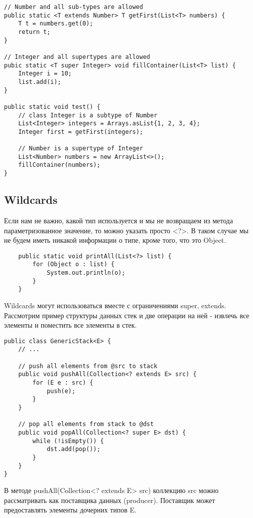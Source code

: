 \documentclass[a4paper,12pt]{extreport}
\begin{document}
\begin{lstlisting}
// Number and all sub-types are allowed
public static <T extends Number> T getFirst(List<T> numbers) {
    T t = numbers.get(0);
    return t;
}

// Integer and all supertypes are allowed
pubic static <T super Integer> void fillContainer(List<T> list) {
    Integer i = 10;
    list.add(i);
}

public static void test() {
    // class Integer is a subtype of Number
    List<Integer> integers = Arrays.asList{1, 2, 3, 4};
    Integer first = getFirst(integers);
    
    // Number is a supertype of Integer
    List<Number> numbers = new ArrayList<>();
    fillContainer(numbers);
}
\end{lstlisting}

\subsection*{Wildcards}
Если нам не важно, какой тип используется и мы не возвращаем из метода параметризованное значение, то можно указать просто <?>. В таком случае мы не будем иметь никакой информации о типе, кроме того, что это Object.

\begin{lstlisting}
    public static void printAll(List<?> list) {
        for (Object o : list) {
            System.out.println(o);
        }
    }
\end{lstlisting}

Wildcards могут использоваться вместе с ограничениями super, extends. Рассмотрим пример структуры данных стек и две операции на ней - извлечь все элементы и поместить все элементы в стек.

\begin{lstlisting}
public class GenericStack<E> {
    // ...
    
    // push all elements from @src to stack
    public void pushAll(Collection<? extends E> src) {
        for (E e : src) {
            push(e);
        }
    }

    // pop all elements from stack to @dst
    public void popAll(Collection<? super E> dst) {
        while (!isEmpty()) {
            dst.add(pop());
        }
    }
}
\end{lstlisting}

В методе pushAll(Collection<? extends E> src) коллекцию src можно рассматривать как поставщика данных (producer). Поставщик может предоставлять элементы дочерних типов E. 
\end{document}
